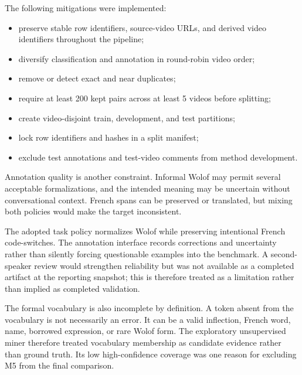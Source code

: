 \documentclass[12pt, a4paper, twoside, openany]{report}
\begin{document}
The following mitigations were implemented:

\begin{itemize}
	\item preserve stable row identifiers, source-video URLs, and derived video identifiers throughout the pipeline;

	\item diversify classification and annotation in round-robin video order;

	\item remove or detect exact and near duplicates;

	\item require at least 200 kept pairs across at least 5 videos before splitting;

	\item create video-disjoint train, development, and test partitions;

	\item lock row identifiers and hashes in a split manifest;

	\item exclude test annotations and test-video comments from method development.
\end{itemize}

Annotation quality is another constraint. Informal Wolof may permit several acceptable formalizations, and the intended meaning may be uncertain without conversational context. French spans can be preserved or translated, but mixing both policies would make the target inconsistent.

The adopted task policy normalizes Wolof while preserving intentional French code-switches. The annotation interface records corrections and uncertainty rather than silently forcing questionable examples into the benchmark. A second-speaker review would strengthen reliability but was not available as a completed artifact at the reporting snapshot; this is therefore treated as a limitation rather than implied as completed validation.

The formal vocabulary is also incomplete by definition. A token absent from the vocabulary is not necessarily an error. It can be a valid inflection, French word, name, borrowed expression, or rare Wolof form. The exploratory unsupervised miner therefore treated vocabulary membership as candidate evidence rather than ground truth. Its low high-confidence coverage was one reason for excluding M5 from the final comparison.


\end{document}
